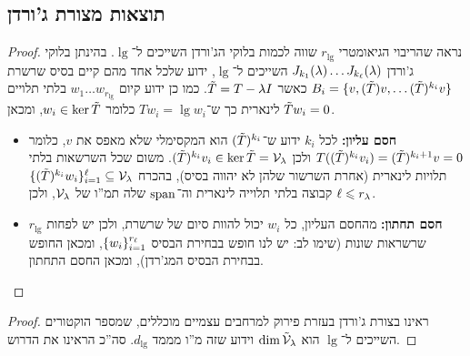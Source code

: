 \documentclass[name=רשימות אלגברה לינארית 2א]{../../../tex/classes/megasumPreamble}
\begin{document}
	\subsection{תוצאות מצורת ג'ורדן}
	\begin{proof}
		נראה שהריבוי הגיאומטרי $r_{\lg}$ שווה לכמות בלוקי הג'ורדן השייכים ל־$\lg$. בהינתן בלוקי ג'ורדן $J_{k_1}(\lambda) \dots J_{k_\ell}(\lambda)$ השייכים ל־$\lg$, ידוע שלכל אחד מהם קיים בסיס שרשרת $B_{i} = \{v, (\tilde T)v, \dots (\tilde T)^{k_i}v\}$ כאשר $\tilde T = T - \lambda I$. כמו כן ידוע קיום $w_1 \dots w_{r_\lg}$ בלתי תלויים לינארית כך ש־$Tw_i = \lg w_i$ כלומר $w_i \in \ker \tilde T$, ומכאן $\tilde T w_i = 0$. 
		\begin{itemize}
			\item \textbf{חסם עליון: }לכל $k_i$ ידוע ש־$(\tilde T)^{k_i}$ הוא המקסימלי שלא מאפס את $v$, כלומר $T((\tilde T)^{k_i}v_i) = (\tilde T)^{k_i + 1}v = 0$ ולכן $(\tilde T)^{k_i}v_i \in \ker \tilde T = \mathcal{V}_{\lambda}$. משום שכל השרשאות בלתי תלויות לינארית (אחרת השרשור שלהן לא יהווה בסיס), בהכרח $\{(\tilde T)^{k_i}w_i\}_{i = 1}^{\ell} \subseteq \mathcal{V}_{\lambda}$ קבוצה בלתי תלוייה לינארית וה־$\operatorname{span}$ שלה תמ''ו של $\mathcal{V}_{\lambda}$, ולכן $\ell \leqslant r_{\lambda}$. 
			\item \textbf{חסם תחתון: }מהחסם העליון, כל $w_i$ יכול להוות סיום של שרשרת, ולכן יש לפחות $r_\lg$ שרשראות שונות (שימו לב: יש לנו חופש בבחירת הבסיס $\{w_i\}_{i = 1}^{r_{\ell}}$, ומכאן החופש בבחירת הבסיס המג'רדן), ומכאן החסם התחתון.
		\end{itemize}\envendproof
	\end{proof}
	\begin{proof}
		ראינו בצורת ג'ורדן בעזרת פירוק למרחבים עצמיים מוכללים, שמספר הוקטורים השייכים ל־$\lg$ הוא $\dim \tilde {\mathcal{V}}_{\lambda}$ וידוע שזה מ''ו מממד $d_{\lg}$. סה''כ הראינו את הדרוש. 
	\end{proof}
	
\end{document}
